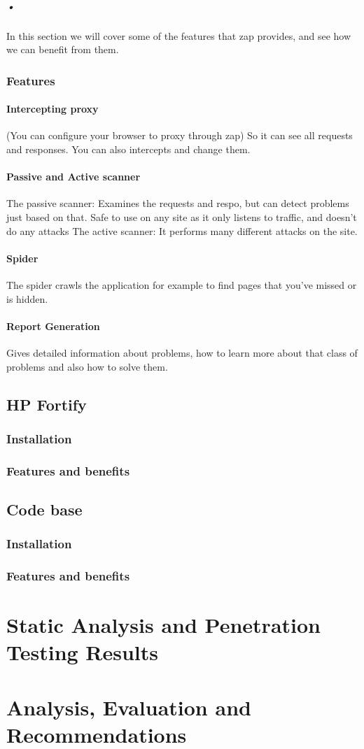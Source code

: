 \documentclass[11pt,english,a4paper]{report}
\begin{document}
\paragraph{•}
In this section we will cover some of the features that \gls{zap} provides, and see how we can benefit from them.
\subsection{Features}
\subsubsection{Intercepting proxy}
(You can configure your browser to proxy through zap) So it can see all requests and responses. You can also intercepts and change them.
\subsubsection{Passive and Active scanner}
The passive scanner: Examines the requests and respo, but can detect problems just based on that. Safe to use on any site as it only listens to traffic, and doesn't do any attacks
The active scanner: It performs many different attacks on the site.

\subsubsection{Spider}
The spider crawls the application for example to find pages that you've missed or is hidden.
\subsubsection{Report Generation}
Gives detailed information about problems, how to learn more about that class of problems and also how to solve them.

\section{HP Fortify}
\subsection{Installation}
\subsection{Features and benefits}
\section{Code base}
\subsection{Installation}
\subsection{Features and benefits}

\chapter{Static Analysis and Penetration Testing Results}
\chapter{Analysis, Evaluation and Recommendations}
\end{document}
